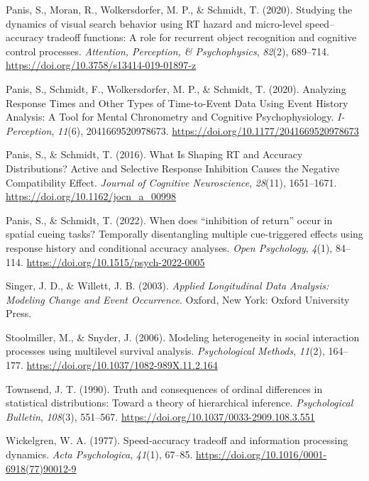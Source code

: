 \documentclass[
  man,floatsintext]{apa6}
\newlength{\cslhangindent}
\newenvironment{CSLReferences}[2] %
 {\begin{list}{}{%
  \setlength{\itemindent}{0pt}
  \setlength{\leftmargin}{0pt}
  \setlength{\parsep}{0pt}
  \ifodd #1
   \setlength{\leftmargin}{\cslhangindent}
   \setlength{\itemindent}{-1\cslhangindent}
  \fi
  \setlength{\itemsep}{#2\baselineskip}}}
 {\end{list}}
\begin{document}
\begin{CSLReferences}{1}{0}
Panis, S., Moran, R., Wolkersdorfer, M. P., \& Schmidt, T. (2020). Studying the dynamics of visual search behavior using {RT} hazard and micro-level speed--accuracy tradeoff functions: {A} role for recurrent object recognition and cognitive control processes. \emph{Attention, Perception, \& Psychophysics}, \emph{82}(2), 689--714. \url{https://doi.org/10.3758/s13414-019-01897-z}

Panis, S., Schmidt, F., Wolkersdorfer, M. P., \& Schmidt, T. (2020). Analyzing {Response Times} and {Other Types} of {Time-to-Event Data Using Event History Analysis}: {A Tool} for {Mental Chronometry} and {Cognitive Psychophysiology}. \emph{I-Perception}, \emph{11}(6), 2041669520978673. \url{https://doi.org/10.1177/2041669520978673}

Panis, S., \& Schmidt, T. (2016). What {Is Shaping RT} and {Accuracy Distributions}? {Active} and {Selective Response Inhibition Causes} the {Negative Compatibility Effect}. \emph{Journal of Cognitive Neuroscience}, \emph{28}(11), 1651--1671. \url{https://doi.org/10.1162/jocn_a_00998}

Panis, S., \& Schmidt, T. (2022). When does {``inhibition of return''} occur in spatial cueing tasks? {Temporally} disentangling multiple cue-triggered effects using response history and conditional accuracy analyses. \emph{Open Psychology}, \emph{4}(1), 84--114. \url{https://doi.org/10.1515/psych-2022-0005}

Singer, J. D., \& Willett, J. B. (2003). \emph{Applied {Longitudinal Data Analysis}: {Modeling Change} and {Event Occurrence}}. Oxford, New York: Oxford University Press.

Stoolmiller, M., \& Snyder, J. (2006). Modeling heterogeneity in social interaction processes using multilevel survival analysis. \emph{Psychological Methods}, \emph{11}(2), 164--177. \url{https://doi.org/10.1037/1082-989X.11.2.164}

Townsend, J. T. (1990). Truth and consequences of ordinal differences in statistical distributions: {Toward} a theory of hierarchical inference. \emph{Psychological Bulletin}, \emph{108}(3), 551--567. \url{https://doi.org/10.1037/0033-2909.108.3.551}

Wickelgren, W. A. (1977). Speed-accuracy tradeoff and information processing dynamics. \emph{Acta Psychologica}, \emph{41}(1), 67--85. \url{https://doi.org/10.1016/0001-6918(77)90012-9}

\end{CSLReferences}
\end{document}
